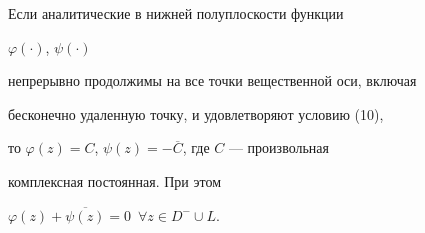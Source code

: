 




\begin{cor}


Если аналитические в нижней полуплоскости функции


$\varphi(\cdot)$, $\psi(\cdot)$


непрерывно продолжимы на все точки вещественной оси, включая


бесконечно удаленную точку, и удовлетворяют условию (10),


то $\varphi(z)=C$, $\psi(z)=-\overline{C}$, где $C$ --- произвольная


комплексная постоянная. При этом


$\varphi(z)+\overline{\psi(z)}=0$\, $\forall z\in D^-\cup L$.


\end{cor}





